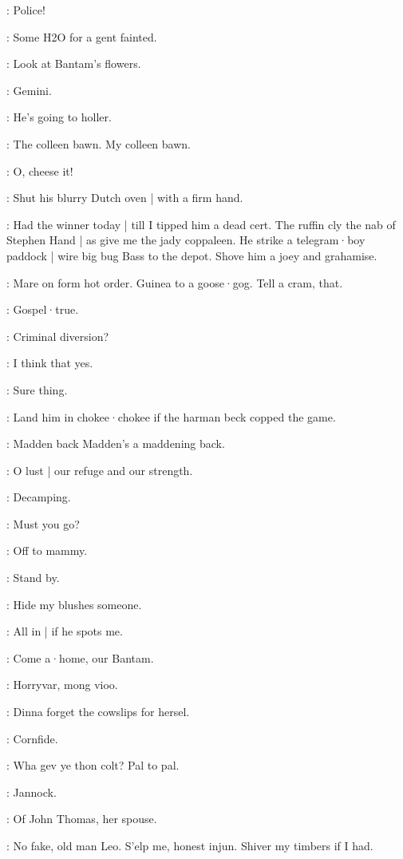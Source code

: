 \crotthers:
Police!

\stephen:
Some H2O for a gent fainted.

\lenehan:
Look at Bantam's flowers.

\Bloom:
Gemini.

\stephen:
He's going to holler.

\bystander:
The colleen bawn.
My colleen bawn.

\madden:
O,
cheese it!

\punch:
Shut his blurry Dutch oven |
with a firm hand.

\lenehan:
Had the winner today |
till I tipped him a dead cert.
The ruffin cly the nab of Stephen Hand |
as give me the jady coppaleen.
He strike a telegram·boy paddock |
wire big bug Bass to the depot.
Shove him a joey and grahamise.

\lenehan:
Mare on form hot order.
Guinea to a goose·gog.
Tell a cram,
that.

\lenehan:
Gospel·true.

\punch:
Criminal diversion?

\stephen:
I think that yes.

\bannon:
Sure thing.

\mulligan:
Land him in chokee·chokee if the harman beck copped the game.

\dixon:
Madden back Madden's a maddening back.

\lynch:
O lust |
our refuge and our strength.

\madden:
Decamping.

\bannon:
Must you go?

\madden:
Off to mammy.

\dixon:
Stand by.

\madden:
Hide my blushes someone.


\Bloom:
All in |
if he spots me.

\punch:
Come a·home,
our Bantam.

\dixon:
Horryvar,
mong vioo.

\crotthers:
Dinna forget the cowslips for hersel.

\bannon:
Cornfide.

\crotthers:
Wha gev ye thon colt?
Pal to pal.

\lynch:
Jannock.

\bantam:
Of John Thomas,
her spouse.

\lenehan:
No fake,
old man Leo.
S'elp me,
honest injun.
Shiver my timbers if I had.

